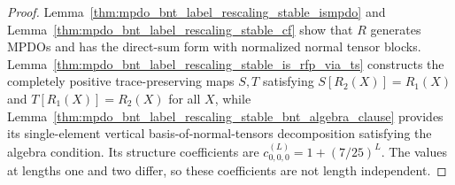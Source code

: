 \begin{proof}\leanok
    Lemma~\ref{thm:mpdo_bnt_label_rescaling_stable_ismpdo} and
    Lemma~\ref{thm:mpdo_bnt_label_rescaling_stable_cf} show that $R$ generates
    MPDOs and has the direct-sum form with normalized normal tensor blocks.
    Lemma~\ref{thm:mpdo_bnt_label_rescaling_stable_is_rfp_via_ts} constructs
    the completely positive trace-preserving maps $S,T$ satisfying
    $S[R_2(X)]=R_1(X)$ and $T[R_1(X)]=R_2(X)$ for all $X$, while
    Lemma~\ref{thm:mpdo_bnt_label_rescaling_stable_bnt_algebra_clause}
    provides its single-element vertical basis-of-normal-tensors decomposition
    satisfying the algebra condition. Its structure coefficients are
    $c^{(L)}_{0,0,0}=1+(7/25)^L$. The values at lengths one and two differ,
    so these coefficients are not length independent.
\end{proof}
